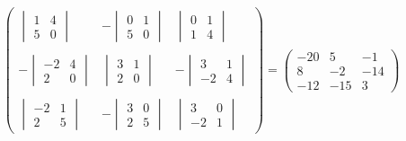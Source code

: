 \documentclass[10pt]{extarticle}
\begin{document}
\begin{itemize}
			\begin{gather*}
				\begin{pmatrix}
					\begin{vmatrix}
						1&4 \\
						5&0
					\end{vmatrix}
				&-\begin{vmatrix}
					0&1 \\
					5&0
				\end{vmatrix}
				&\begin{vmatrix}
						0&1 \\
					1&4
				\end{vmatrix}
				 \\
				 \\
				 	-\begin{vmatrix}
				 		-2&4\\
				 		2&0
				 	\end{vmatrix}
				 	&\begin{vmatrix}
				 		3&1 \\
				 		2&0
				 	\end{vmatrix}
				 	&-\begin{vmatrix}
				 			3&1 \\
				 		-2&4
				 	\end{vmatrix}
				 	\\
				 	\\
				 		\begin{vmatrix}
				 				-2&1\\
				 			2&5
				 		\end{vmatrix}
				 		&-\begin{vmatrix}
				 			3&0 \\
				 			2&5
				 		\end{vmatrix}
				 		&\begin{vmatrix}
				 			3&0 \\
				 			-2&1
				 		\end{vmatrix}
				\end{pmatrix}
			=\begin{pmatrix}
				-20&5&-1 \\
				8&-2&-14\\
				-12&-15&3
			\end{pmatrix}
			\end{gather*}
			

\end{itemize}
\end{document}
